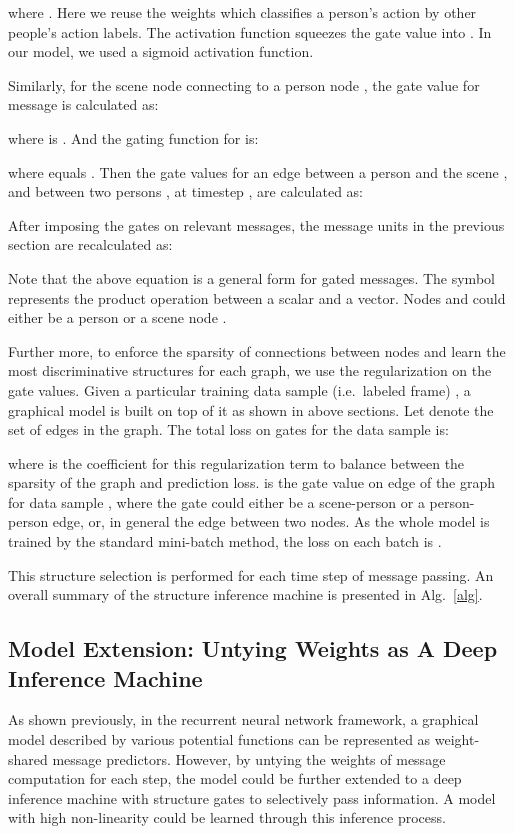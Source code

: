 \documentclass[10pt,twocolumn,letterpaper]{article}
\begin{document}
where . Here we reuse the weights  which classifies a person's action by other people's action labels. The activation function  squeezes the gate value into . In our model, we used a sigmoid activation function.

Similarly, for the scene node  connecting to a person node , the gate value for message  is calculated as:

where  is . And the gating function for  is:

where  equals . Then the gate values for an edge between a person and the scene , and between two persons , at timestep , are calculated as:



After imposing the gates on relevant messages, the message units in the previous section are recalculated as:

Note that the above equation is a general form for gated messages. The symbol  represents the product operation between a scalar and a vector. Nodes  and  could either be a person  or a scene node . 

Further more, to enforce the sparsity of connections between nodes and learn the most discriminative structures for each graph, we use the  regularization on the gate values. Given a particular training data sample (i.e.\ labeled frame) , a graphical model is built on top of it as shown in above sections. Let  denote the set of edges in the graph. The total loss on gates for the data sample  is:

where  is the coefficient for this  regularization term to balance between the sparsity of the graph and prediction loss.  is the gate value on edge  of the graph for data sample , where the gate could either be a scene-person or a person-person edge, or, in general the edge between two nodes. As the whole model is trained by the standard mini-batch method, the loss on each batch  is .





This structure selection is performed for each time step of message passing. An overall summary of the structure inference machine is presented in Alg.~\ref{alg}.

\subsection{Model Extension: Untying Weights as A Deep Inference Machine}
\label{sec:dim}

As shown previously, in the recurrent neural network framework, a graphical model described by various potential functions can be represented as weight-shared message predictors. However, by untying the weights of message computation for each step, the model could be further extended to a deep inference machine with structure gates to selectively pass information. A model with high non-linearity could be learned through this inference process.
\end{document}
